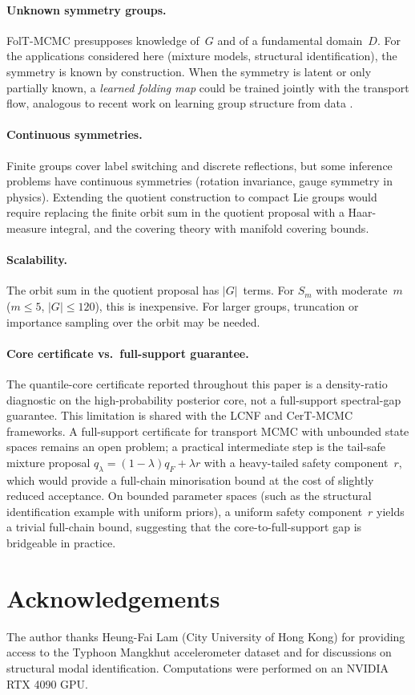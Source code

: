 \paragraph{Unknown symmetry groups.}
FolT-MCMC presupposes knowledge of~$G$ and of a fundamental
domain~$D$.  For the applications considered here (mixture models,
structural identification), the symmetry is known by construction.
When the symmetry is latent or only partially known, a
\emph{learned folding map} could be trained jointly with the
transport flow, analogous to recent work on learning group
structure from data \citep{Dehmamy2021}.

\paragraph{Continuous symmetries.}
Finite groups cover label switching and discrete reflections, but
some inference problems have continuous symmetries (rotation
invariance, gauge symmetry in physics).  Extending the quotient
construction to compact Lie groups would require replacing the
finite orbit sum in the quotient proposal with a
Haar-measure integral, and the covering theory with manifold
covering bounds.

\paragraph{Scalability.}
The orbit sum in the quotient proposal has $|G|$~terms.
For $S_m$ with moderate~$m$ ($m \leq 5$, $|G| \leq 120$),
this is inexpensive.  For larger groups, truncation or importance
sampling over the orbit may be needed.

\paragraph{Core certificate vs.\ full-support guarantee.}
The quantile-core certificate reported throughout this paper is a
density-ratio diagnostic on the high-probability posterior core,
not a full-support spectral-gap guarantee.  This limitation is
shared with the LCNF \citep{LCNF} and CerT-MCMC
\citep{CerTMCMC} frameworks.  A full-support certificate for
transport MCMC with unbounded state spaces remains an open problem;
a practical intermediate step is the tail-safe mixture proposal
$q_\lambda = (1{-}\lambda)q_F + \lambda r$ with a heavy-tailed
safety component~$r$, which would provide a full-chain
minorisation bound at the cost of slightly reduced acceptance.
On bounded parameter spaces (such as the structural identification
example with uniform priors), a uniform safety component~$r$
yields a trivial full-chain bound, suggesting that the
core-to-full-support gap is bridgeable in practice.


\section*{Acknowledgements}

The author thanks Heung-Fai Lam (City University of Hong Kong) for
providing access to the Typhoon Mangkhut accelerometer dataset and
for discussions on structural modal identification.
Computations were performed on an NVIDIA RTX 4090 GPU.
